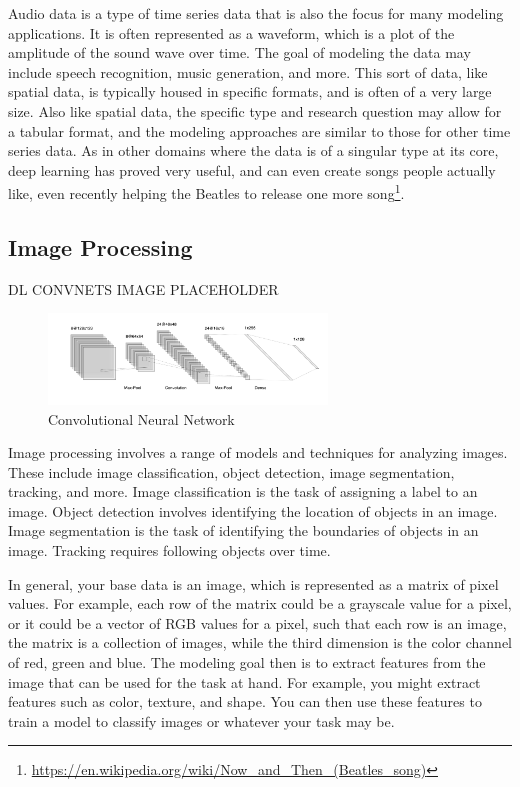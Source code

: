 \documentclass[
  letterpaper,
]{krantz}
\DeclareRobustCommand{\href}[2]{#2\footnote{\url{#1}}}
\begin{document}
Audio data is a type of time series data that is also the focus for many
modeling applications. It is often represented as a waveform, which is a
plot of the amplitude of the sound wave over time. The goal of modeling
the data may include speech recognition, music generation, and more.
This sort of data, like spatial data, is typically housed in specific
formats, and is often of a very large size. Also like spatial data, the
specific type and research question may allow for a tabular format, and
the modeling approaches are similar to those for other time series data.
As in other domains where the data is of a singular type at its core,
deep learning has proved very useful, and can even create songs people
actually like,
\href{https://en.wikipedia.org/wiki/Now_and_Then_(Beatles_song)}{even
recently helping the Beatles to release one more song}.

\subsection{Image Processing}\label{image-processing}

DL CONVNETS IMAGE PLACEHOLDER

\begin{figure}

{\centering \includegraphics[width=0.66\textwidth,height=\textheight]{img/cnn.png}

}

\caption{\label{fig-cnn}Convolutional Neural Network}

\end{figure}

Image processing involves a range of models and techniques for analyzing
images. These include image classification, object detection, image
segmentation, tracking, and more. Image classification is the task of
assigning a label to an image. Object detection involves identifying the
location of objects in an image. Image segmentation is the task of
identifying the boundaries of objects in an image. Tracking requires
following objects over time.

In general, your base data is an image, which is represented as a matrix
of pixel values. For example, each row of the matrix could be a
grayscale value for a pixel, or it could be a vector of RGB values for a
pixel, such that each row is an image, the matrix is a collection of
images, while the third dimension is the color channel of red, green and
blue. The modeling goal then is to extract features from the image that
can be used for the task at hand. For example, you might extract
features such as color, texture, and shape. You can then use these
features to train a model to classify images or whatever your task may
be.
\end{document}
